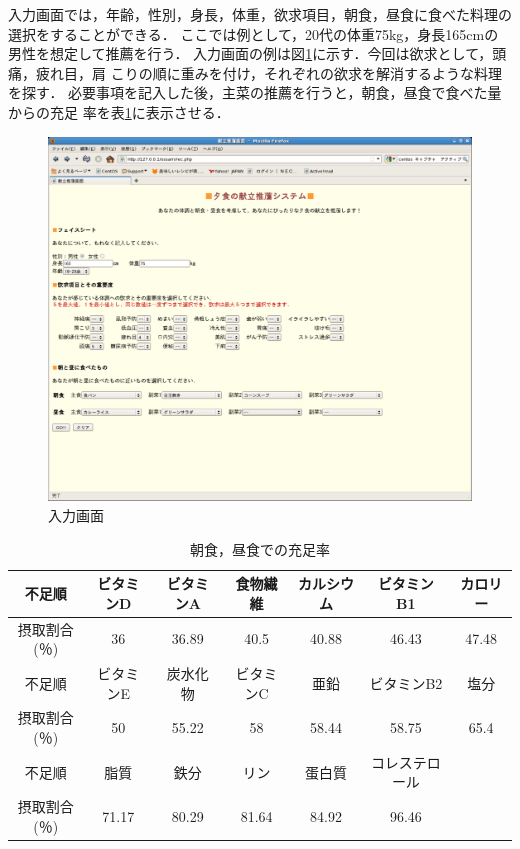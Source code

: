 \documentclass[11pt,titlepage,uplatex]{ujreport}
\begin{document}
入力画面では，年齢，性別，身長，体重，欲求項目，朝食，昼食に食べた料理の
選択をすることができる．
ここでは例として，20代の体重75kg，身長165cmの男性を想定して推薦を行う．
入力画面の例は図\ref{fig:入力}に示す．今回は欲求として，頭痛，疲れ目，肩
こりの順に重みを付け，それぞれの欲求を解消するような料理を探す．
必要事項を記入した後，主菜の推薦を行うと，朝食，昼食で食べた量からの充足
率を表\ref{tab:デモ１}に表示させる．
\begin{figure}[tbh]
  \centering
\includegraphics[scale=0.3]{input.pdf}
\caption{入力画面}
\label{fig:入力}
\end{figure}
\begin{table}[tbh]
  \caption{朝食，昼食での充足率}
  \label{tab:デモ１}
  \scriptsize
  \centering
    \begin{tabular}{c||cccccc}
      \hline
      不足順 & ビタミンD & ビタミンA & 食物繊維 & カルシウム & ビタミンB1 & カロリー\\
      \hline
      摂取割合(％) & 36 & 36.89 & 40.5 & 40.88 & 46.43 & 47.48\\
      \hline \hline
      不足順 & ビタミンE & 炭水化物 & ビタミンC & 亜鉛 & ビタミンB2 & 塩分 \\
      \hline
      摂取割合(％)& 50 & 55.22 & 58 & 58.44 & 58.75 & 65.4\\
      \hline \hline
      不足順 & 脂質 & 鉄分 & リン & 蛋白質 & コレステロール & \\
      \hline
      摂取割合(％)& 71.17 & 80.29 & 81.64 & 84.92 & 96.46 & \\
      \hline
    \end{tabular}
\end{table}
\end{document}

